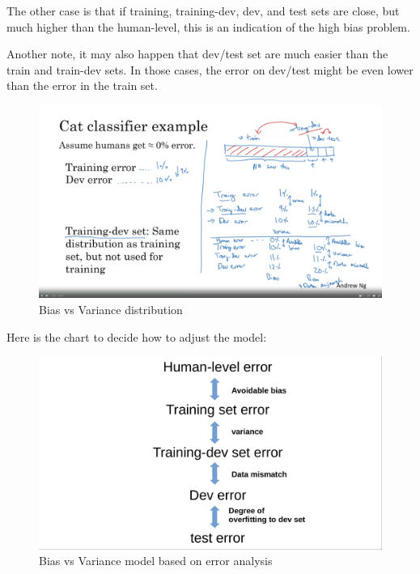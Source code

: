 \documentclass[12pt]{report}
\begin{document}
The other case is that if training, training-dev, dev, and test sets are close, but much higher than the human-level, this is an indication of the high bias problem.

Another note, it may also happen that dev/test set are much easier than the train and train-dev sets. In those cases, the error on dev/test might be even lower than the error in the train set.

\begin{figure}[H]
  \centering
  \includegraphics[trim =0.0cm 0.0cm 0.0cm 0.0cm, clip, scale=0.12]{pics/biasVariance_dist.png}
  \caption{Bias vs Variance distribution}
\end{figure}

Here is the chart to decide how to adjust the model:

\begin{figure}[H]
  \centering
  \includegraphics[trim =0.0cm 0.0cm 0.0cm 0.0cm, clip, scale=0.12]{pics/biasVariance_chart.png}
  \caption{Bias vs Variance model based on error analysis}
\end{figure}
\end{document}
